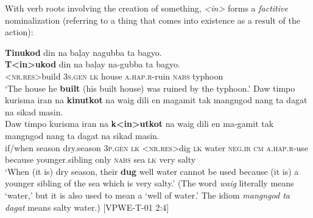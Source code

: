 With verb roots involving the creation of something, \textit{<in>} forms a \textit{factitive} nominalization (referring to a thing that comes into existence as a result of the action):

\ea
\textbf{Tinukod}  din  na  baļay  nagubba  ta  bagyo. \\\smallskip
 \gll \textbf{T<in>ukod}  din  na  baļay  na-gubba  ta  bagyo. \\
\textsc{<nr.res>}build  3\textsc{s.gen} \textsc{lk}  house  \textsc{a.hap.r}-ruin  \textsc{nabs}  typhoon \\
\glt ‘The house he \textbf{built} (his built house) was ruined by the typhoon.’
\z
\ea
Daw  timpo  kurisma  iran  na  \textbf{kinutkot}  na  waig  dili en  magamit  tak  mangngod  nang  ta  dagat  na  sikad  masin. \\\smallskip
 \gll Daw  timpo  kurisma  iran  na  \textbf{k<in>utkot}  na  waig  dili en  ma-gamit  tak  mangngod  nang  ta  dagat  na  sikad  masin. \\
if/when  season  dry.season  3\textsc{p.gen} \textsc{lk}  <\textsc{nr.res}>dig  \textsc{lk} water  \textsc{neg.ir}  \textsc{cm} \textsc{a.hap.r}-use  because  younger.sibling  only  \textsc{nabs}  sea  \textsc{lk}  very  salty \\
\glt ‘When (it is) dry season, their \textbf{dug} well water cannot be used because (it is) a younger sibling of the sea which is very salty.’ (The word \textit{waig} literally means ‘water,’ but it is also used to mean a ‘well of water.’ The idiom \textit{mangngod ta dagat} means salty water.) [VPWE-T-01 2:4]
\z

